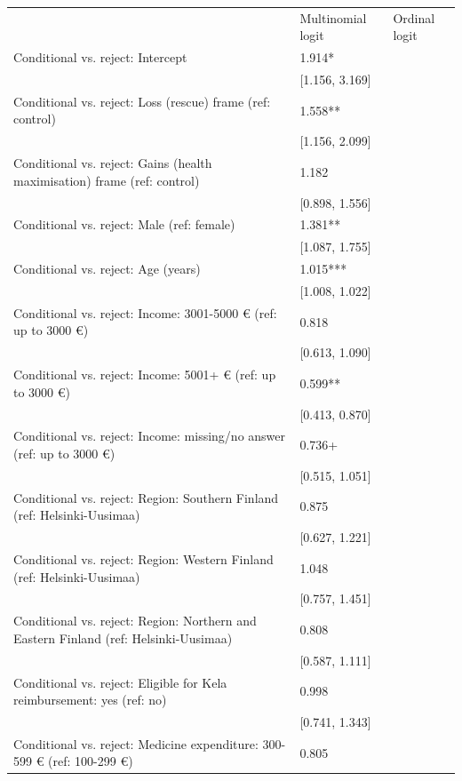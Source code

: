 \begin{tabular}{lll}
& Multinomial logit & Ordinal logit \\
Conditional vs. reject: Intercept & \num{1.914}* &  \\
& [\num{1.156}, \num{3.169}] &  \\
Conditional vs. reject: Loss (rescue) frame (ref: control) & \num{1.558}** &  \\
& [\num{1.156}, \num{2.099}] &  \\
Conditional vs. reject: Gains (health maximisation) frame (ref: control) & \num{1.182} &  \\
& [\num{0.898}, \num{1.556}] &  \\
Conditional vs. reject: Male (ref: female) & \num{1.381}** &  \\
& [\num{1.087}, \num{1.755}] &  \\
Conditional vs. reject: Age (years) & \num{1.015}*** &  \\
& [\num{1.008}, \num{1.022}] &  \\
Conditional vs. reject: Income: 3001-5000 € (ref: up to 3000 €) & \num{0.818} &  \\
& [\num{0.613}, \num{1.090}] &  \\
Conditional vs. reject: Income: 5001+ € (ref: up to 3000 €) & \num{0.599}** &  \\
& [\num{0.413}, \num{0.870}] &  \\
Conditional vs. reject: Income: missing/no answer (ref: up to 3000 €) & \num{0.736}+ &  \\
& [\num{0.515}, \num{1.051}] &  \\
Conditional vs. reject: Region: Southern Finland (ref: Helsinki-Uusimaa) & \num{0.875} &  \\
& [\num{0.627}, \num{1.221}] &  \\
Conditional vs. reject: Region: Western Finland (ref: Helsinki-Uusimaa) & \num{1.048} &  \\
& [\num{0.757}, \num{1.451}] &  \\
Conditional vs. reject: Region: Northern and Eastern Finland (ref: Helsinki-Uusimaa) & \num{0.808} &  \\
& [\num{0.587}, \num{1.111}] &  \\
Conditional vs. reject: Eligible for Kela reimbursement: yes (ref: no) & \num{0.998} &  \\
& [\num{0.741}, \num{1.343}] &  \\
Conditional vs. reject: Medicine expenditure: 300-599 € (ref: 100-299 €) & \num{0.805} &  \\

\end{tabular}
